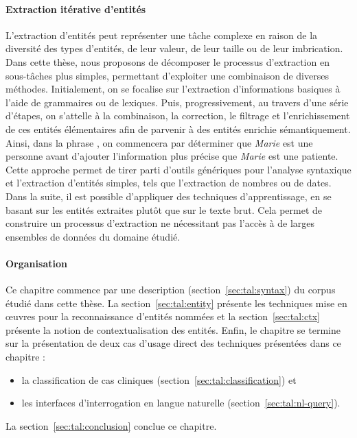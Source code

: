 \paragraph{Extraction itérative d'entités}
L'extraction d'entités peut représenter une tâche complexe en raison de la diversité des types d'entités, de leur valeur, de leur taille ou de leur imbrication.
Dans cette thèse, nous proposons de décomposer le processus d'extraction en sous-tâches plus simples, permettant d'exploiter une combinaison de diverses méthodes.
Initialement, on se focalise sur l'extraction d'informations basiques à l'aide de grammaires ou de lexiques.
Puis, progressivement, au travers d'une série d'étapes, on s'attelle à la combinaison, la correction, le filtrage et l'enrichissement de ces entités élémentaires afin de parvenir à des entités enrichie sémantiquement.
Ainsi, dans la phrase , on commencera par déterminer que \emph{Marie} est une personne avant d'ajouter l'information plus précise que \emph{Marie} est une patiente.
Cette approche permet de tirer parti d'outils génériques pour l'analyse syntaxique et l'extraction d'entités simples, tels que l'extraction de nombres ou de dates.
Dans la suite, il est possible d'appliquer des techniques d'apprentissage, en se basant sur les entités extraites plutôt que sur le texte brut.
Cela permet de construire un processus d'extraction ne nécessitant pas l'accès à de larges ensembles de données du domaine étudié.

\paragraph{Organisation}
Ce chapitre commence par une description (section~\ref{sec:tal:syntax}) du corpus étudié dans cette thèse.
La section~\ref{sec:tal:entity} présente les techniques mise en œuvres pour la reconnaissance d'entités nommées et la section~\ref{sec:tal:ctx} présente la notion de contextualisation des entités.
Enfin, le chapitre se termine sur la présentation de deux cas d'usage direct des techniques présentées dans ce chapitre :
\begin{itemize}
    \item la classification de cas cliniques (section~\ref{sec:tal:classification}) et
    \item les interfaces d'interrogation en langue naturelle (section~\ref{sec:tal:nl-query}).
\end{itemize}
La section~\ref{sec:tal:conclusion} conclue ce chapitre.
